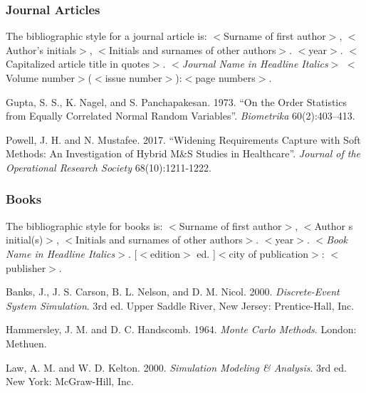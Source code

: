 \documentclass{article}
\begin{document}

\subsubsection{Journal Articles}
The bibliographic style for a journal article is: 
$<$Surname of first author$>$, $<$Author's initials$>$,
$<$Initials and surnames of other authors$>$. $<$year$>$.
$<$Capitalized article title in quotes$>$. $<${\em Journal Name in
Headline Italics}$>$ $<$Volume number$>$($<$issue number$>$):$<$page numbers$>$.

{\footnotesize
\begin{hangref}
\item Gupta, S. S., K. Nagel, and S. Panchapakesan. 1973. ``On the Order Statistics from Equally Correlated Normal Random Variables''. \textit{Biometrika} 60(2):403--413.
\item Powell, J. H. and N. Mustafee. 2017. ``Widening Requirements Capture with Soft Methods: An Investigation of Hybrid M\&S Studies in Healthcare''. \textit{Journal of the Operational Research Society} 68(10):1211-1222.
\end{hangref}
}

\subsubsection{Books}
The bibliographic style for books is: 
$<$Surname of first author$>$, $<$Author s initial(s)$>$, $<$Initials and surnames of other authors$>$. $<$year$>$. 
$<${\em Book Name in Headline Italics}$>$. [$<$edition$>$ ed. ]$<$city of publication$>$: $<$publisher$>$. 

{\footnotesize
\begin{hangref}
\item Banks, J., J. S. Carson, B. L. Nelson, and D. M. Nicol. 2000. \textit{Discrete-Event System Simulation}. 3rd ed. Upper Saddle River, New Jersey: Prentice-Hall, Inc.
\item Hammersley, J. M. and D. C. Handscomb. 1964. \textit{Monte Carlo Methods}. London: Methuen.
\item Law, A. M. and W. D. Kelton. 2000. \textit{Simulation Modeling \& Analysis}. 3rd ed. New York: McGraw-Hill, Inc.
\end{hangref}
}
\end{document}
